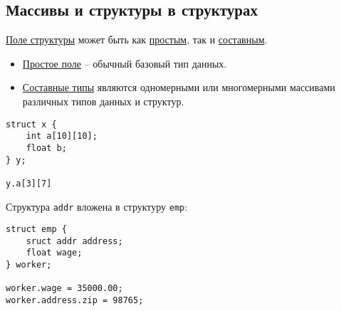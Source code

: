 \subsection{Массивы и структуры в структурах}

\underline{Поле структуры} может быть как \underline{простым}, так и \underline{составным}.

\begin{itemize}
\item \underline{Простое поле} – обычный базовый тип данных.
\item \underline{Составные типы} являются одномерными или многомерными массивами различных типов данных и структур.
\end{itemize}

\begin{verbatim}
struct x { 
    int a[10][10];
    float b;
} y;

y.a[3][7]
\end{verbatim}

Структура \texttt{addr} вложена в структуру \texttt{emp}:

\begin{verbatim}
struct emp { 
    sruct addr address;
    float wage;
} worker;

worker.wage = 35000.00;
worker.address.zip = 98765;
\end{verbatim}